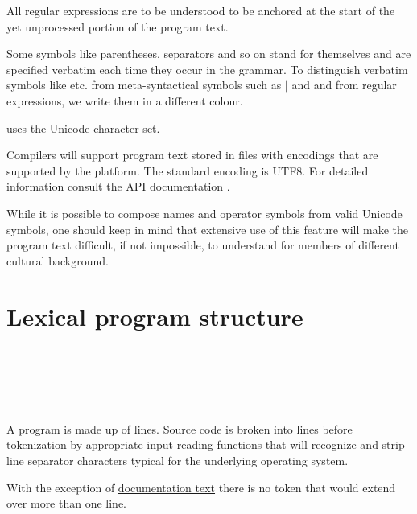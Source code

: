 All regular expressions are to be understood to be anchored at the start of the yet unprocessed portion of the program text.

\par Some symbols like parentheses, separators and so on stand for themselves and are specified verbatim each time they occur in the grammar. To distinguish verbatim symbols like \sym{<- , ; ::} etc. from meta-syntactical symbols such as {\Large $|$} and  and from regular expressions, we write them in a different colour.


\par \frege{} uses the Unicode character set. 

Compilers will support program text stored in files with encodings
that are supported by the \java{} platform. The standard encoding is UTF8.
For detailed information consult the \java{}
API documentation \cite{apidoc}. 

While it is possible to compose names and operator symbols from
valid Unicode symbols, one should keep in mind that extensive use of
this feature will make the program text
difficult, if not impossible, to understand for members of different
cultural background.

\section{Lexical program structure}

\begin{flushleft}
 \\
  \\
 \\
  \oder {} \oder {} \oder {} \oder {} \oder {}
\\\hspace{0.5in} \oder {} \oder {}
\end{flushleft}

A program is made up of lines.
Source code is broken into lines before tokenization by appropriate
input reading functions that will recognize and strip line separator
characters typical for the underlying operating system. 

With the exception of \hyperref[doccomment]{documentation text} there is no token that would
extend over more than one line.

